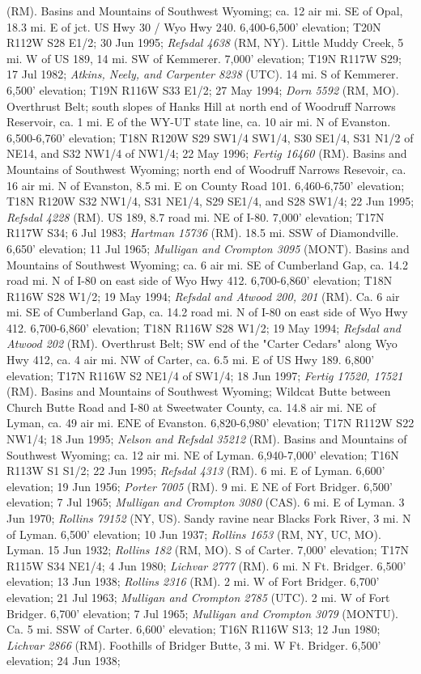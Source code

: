 (RM).  Basins and Mountains of Southwest Wyoming; ca. 12 air mi. SE of Opal, 18.3 mi. E of jct. US Hwy 30 / Wyo Hwy 240. 6,400-6,500' elevation; T20N R112W S28 E1/2; 30 Jun 1995; \textit{Refsdal 4638} (RM, NY).  Little Muddy Creek, 5 mi. W of US 189, 14 mi. SW of Kemmerer. 7,000' elevation; T19N R117W S29; 17 Jul 1982; \textit{Atkins, Neely, and Carpenter 8238} (UTC).  14 mi. S of Kemmerer. 6,500' elevation; T19N R116W S33 E1/2; 27 May 1994; \textit{Dorn 5592} (RM, MO).  Overthrust Belt; south slopes of Hanks Hill at north end of Woodruff Narrows Reservoir, ca. 1 mi. E of the WY-UT state line, ca. 10 air mi. N of Evanston. 6,500-6,760' elevation; T18N R120W S29 SW1/4 SW1/4, S30 SE1/4, S31 N1/2 of NE14, and S32 NW1/4 of NW1/4; 22 May 1996; \textit{Fertig 16460} (RM).  Basins and Mountains of Southwest Wyoming; north end of Woodruff Narrows Resevoir, ca. 16 air mi. N of Evanston, 8.5 mi. E on County Road 101. 6,460-6,750' elevation; T18N R120W S32 NW1/4, S31 NE1/4, S29 SE1/4, and S28 SW1/4; 22 Jun 1995; \textit{Refsdal 4228} (RM).  US 189, 8.7 road mi. NE of I-80. 7,000' elevation; T17N R117W S34; 6 Jul 1983; \textit{Hartman 15736} (RM).  18.5 mi. SSW of Diamondville. 6,650’ elevation; 11 Jul 1965; \textit{Mulligan and Crompton 3095} (MONT).  Basins and Mountains of Southwest Wyoming; ca. 6 air mi. SE of Cumberland Gap, ca. 14.2 road mi. N of I-80 on east side of Wyo Hwy 412. 6,700-6,860' elevation; T18N R116W S28 W1/2; 19 May 1994; \textit{Refsdal and Atwood 200, 201} (RM).  Ca. 6 air mi. SE of Cumberland Gap, ca. 14.2 road mi. N of I-80 on east side of Wyo Hwy 412. 6,700-6,860' elevation; T18N R116W S28 W1/2; 19 May 1994; \textit{Refsdal and Atwood 202} (RM).  Overthrust Belt; SW end of the "Carter Cedars" along Wyo Hwy 412, ca. 4 air mi. NW of Carter, ca. 6.5 mi. E of US Hwy 189. 6,800' elevation; T17N R116W S2 NE1/4 of SW1/4; 18 Jun 1997; \textit{Fertig 17520, 17521} (RM).  Basins and Mountains of Southwest Wyoming; Wildcat Butte between Church Butte Road and I-80 at Sweetwater County, ca. 14.8 air mi. NE of Lyman, ca. 49 air mi. ENE of Evanston.  6,820-6,980' elevation; T17N R112W S22 NW1/4; 18 Jun 1995; \textit{Nelson and Refsdal 35212} (RM).  Basins and Mountains of Southwest Wyoming; ca. 12 air mi. NE of Lyman. 6,940-7,000' elevation; T16N R113W S1 S1/2; 22 Jun 1995; \textit{Refsdal 4313} (RM).  6 mi. E of Lyman. 6,600’ elevation; 19 Jun 1956; \textit{Porter 7005} (RM).  9 mi. E NE of Fort Bridger. 6,500’ elevation; 7 Jul 1965; \textit{Mulligan and Crompton 3080} (CAS).  6 mi. E of Lyman. 3 Jun 1970; \textit{Rollins 79152} (NY, US).  Sandy ravine near Blacks Fork River, 3 mi. N of Lyman.	6,500' elevation; 10 Jun 1937; \textit{Rollins 1653} (RM, NY, UC, MO).  Lyman. 15 Jun 1932; \textit{Rollins 182} (RM, MO).  S of Carter. 7,000' elevation; T17N R115W S34 NE1/4; 4 Jun 1980; \textit{Lichvar 2777} (RM).  6 mi. N Ft. Bridger. 6,500' elevation; 13 Jun 1938; \textit{Rollins 2316} (RM).  2 mi. W of Fort Bridger. 6,700’ elevation; 21 Jul 1963; \textit{Mulligan and Crompton 2785} (UTC).  2 mi. W of Fort Bridger. 6,700’ elevation; 7 Jul 1965; \textit{Mulligan and Crompton 3079} (MONTU).  Ca. 5 mi. SSW of Carter. 6,600' elevation; T16N R116W S13; 12 Jun 1980; \textit{Lichvar 2866} (RM).  Foothills of Bridger Butte, 3 mi. W Ft. Bridger. 6,500’ elevation; 24 Jun 1938; 